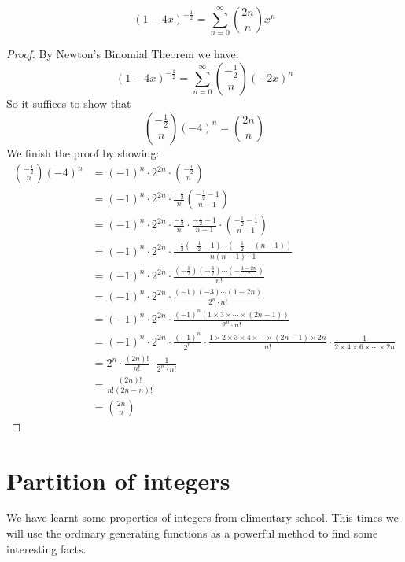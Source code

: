 \begin{lemma}
    $$(1-4x)^{-\frac{1}{2}}=\sum_{n=0}^{\infty}{2n \choose n}x^n$$
\end{lemma}
\begin{proof}
    By Newton's Binomial Theorem we have: $$(1-4x)^{-\frac{1}{2}}=\sum_{n=0}^{\infty}{-\frac{1}{2} \choose n}(-2x)^n$$
    So it suffices to show that $${-\frac{1}{2} \choose n}(-4)^n={2n \choose n}$$
    We finish the proof by showing:
    \begin{equation}
        \begin{split}
            {-\frac{1}{2} \choose n}(-4)^n &= (-1)^n \cdot 2^{2n} \cdot {-\frac{1}{2} \choose n}\\
            &= (-1)^n \cdot 2^{2n} \cdot \frac{-\frac{1}{2}}{n}{-\frac{1}{2}-1 \choose n-1}\\
            &= (-1)^n \cdot 2^{2n} \cdot \frac{-\frac{1}{2}}{n} \cdot \frac{-\frac{1}{2}-1}{n-1} \cdot {-\frac{1}{2}-1 \choose n-1}\\
            &= (-1)^n \cdot 2^{2n} \cdot \frac{-\frac{1}{2}(-\frac{1}{2}-1) \cdots (-\frac{1}{2}-(n-1))}{n(n-1) \cdots 1}\\
            &= (-1)^n \cdot 2^{2n} \cdot \frac{(-\frac{1}{2})(-\frac{3}{2}) \cdots (-\frac{1-2n}{2})}{n!}\\
            &= (-1)^n \cdot 2^{2n} \cdot \frac{(-1)(-3) \cdots (1-2n)}{2^n \cdot n!}\\
            &= (-1)^n \cdot 2^{2n} \cdot \frac{(-1)^n(1 \times 3 \times \cdots \times (2n-1))}{2^n \cdot n!}\\
            &= (-1)^n \cdot 2^{2n} \cdot \frac{(-1)^n}{2^n} \cdot \frac{1 \times 2 \times3 \times 4 \times \cdots \times (2n-1) \times 2n}{n!} \cdot \frac{1}{2 \times 4 \times 6 \times \cdots \times 2n}\\
            &= 2^n \cdot \frac{(2n)!}{n!} \cdot \frac{1}{2^n \cdot n!}\\
            &= \frac{(2n)!}{n!(2n-n)!}\\
            &= {2n \choose n}
        \end{split}
    \end{equation}
\end{proof}

\section{Partition of integers}

We have learnt some properties of integers from elimentary school. This times we will use the ordinary generating functions as a powerful method to find some interesting facts.

